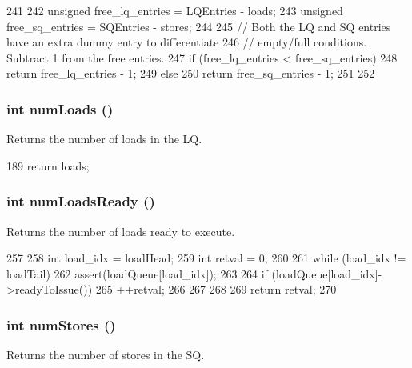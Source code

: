 \begin{DoxyCode}
241 {
242     unsigned free_lq_entries = LQEntries - loads;
243     unsigned free_sq_entries = SQEntries - stores;
244 
245     // Both the LQ and SQ entries have an extra dummy entry to differentiate
246     // empty/full conditions.  Subtract 1 from the free entries.
247     if (free_lq_entries < free_sq_entries) {
248         return free_lq_entries - 1;
249     } else {
250         return free_sq_entries - 1;
251     }
252 }
\end{DoxyCode}
\hypertarget{classOzoneLSQ_a54460b759fb06e2b18e26657279a6f49}{
\subsubsection[{numLoads}]{\setlength{\rightskip}{0pt plus 5cm}int numLoads ()}}
\label{classOzoneLSQ_a54460b759fb06e2b18e26657279a6f49}
Returns the number of loads in the LQ. 


\begin{DoxyCode}
189 { return loads; }
\end{DoxyCode}
\hypertarget{classOzoneLSQ_a9aa5d5a61b2229931008ac2ea802a3ab}{
\subsubsection[{numLoadsReady}]{\setlength{\rightskip}{0pt plus 5cm}int numLoadsReady ()}}
\label{classOzoneLSQ_a9aa5d5a61b2229931008ac2ea802a3ab}
Returns the number of loads ready to execute. 


\begin{DoxyCode}
257 {
258     int load_idx = loadHead;
259     int retval = 0;
260 
261     while (load_idx != loadTail) {
262         assert(loadQueue[load_idx]);
263 
264         if (loadQueue[load_idx]->readyToIssue()) {
265             ++retval;
266         }
267     }
268 
269     return retval;
270 }
\end{DoxyCode}
\hypertarget{classOzoneLSQ_aa0fc32a4a9d77696f5907f4d25e7d07f}{
\subsubsection[{numStores}]{\setlength{\rightskip}{0pt plus 5cm}int numStores ()}}
\label{classOzoneLSQ_aa0fc32a4a9d77696f5907f4d25e7d07f}
Returns the number of stores in the SQ. 



